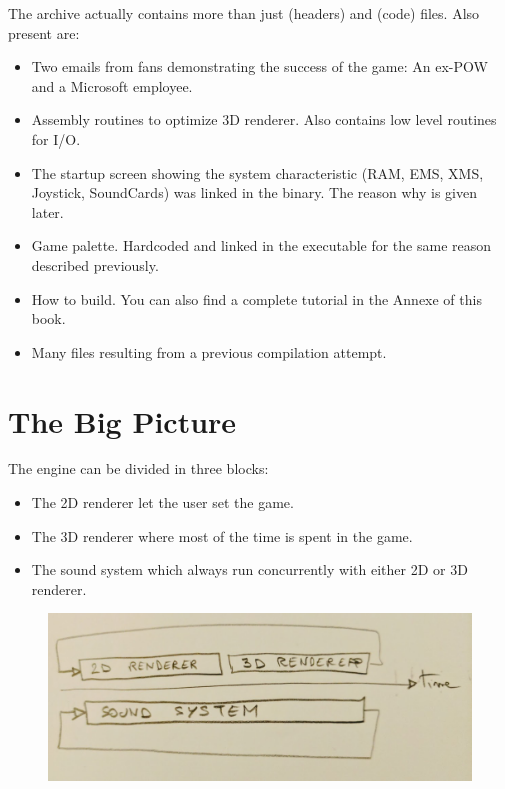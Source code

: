 \documentclass[book.tex]{subfiles}
\begin{document}
The archive actually contains more than just  (headers) and  (code) files. Also present are:
\begin{itemize}
\item {} Two emails from fans demonstrating the success of the game: An ex-POW and a Microsoft employee.
\item {} Assembly routines to optimize 3D renderer. Also contains low level routines for I/O.
\item {} The startup screen showing the system characteristic (RAM, EMS, XMS, Joystick, SoundCards) was linked in the binary. The reason why is given later.
\item {} Game palette. Hardcoded and linked in the executable for the same reason described previously.
\item {} How to build. You can also find a complete tutorial in the Annexe of this book.
\item Many files resulting from a previous compilation attempt.
\end{itemize}







\section{The Big Picture}
The engine can be divided in three blocks:
\begin{itemize}
\item The 2D renderer let the user set the game.
\item The 3D renderer where most of the time is spent in the game.
\item The sound system which always run concurrently with either 2D or 3D renderer. 
\end{itemize}

\par
\begin{figure}[H]
\centering
 \includegraphics[width=\textwidth]{imgs/three_systems.png}
 \end{figure}
 \par
\end{document}
